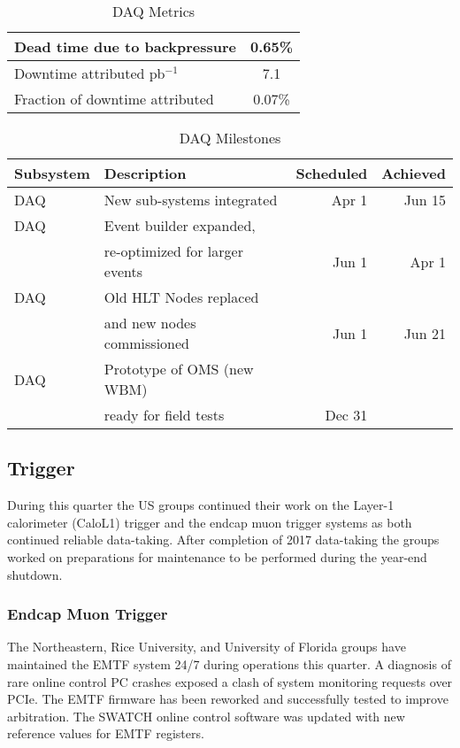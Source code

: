 \documentclass[12pt]{article}
\begin{document}
\begin{table}[htp]
\caption{DAQ Metrics}
\begin{center}
\begin{tabular}{|l|c|}
\hline
Dead time due to backpressure &0.65\%  \\
\hline
Downtime attributed pb$^{-1}$ &7.1 \\
Fraction of downtime attributed&0.07\% \\
\hline
\end{tabular}
\end{center}
\label{DAQMetrics}
\end{table}%
\begin{table}[h]
\caption{DAQ Milestones}
\begin{center}
\begin{tabular}{|l|l|r|r|}
\hline
Subsystem&Description&Scheduled&Achieved\\
\hline
DAQ& New sub-systems integrated  & Apr 1&Jun 15 \\
\hline
DAQ& Event builder expanded, & &\\
   & re-optimized for larger events & Jun 1 &Apr 1 \\
\hline
DAQ& Old HLT Nodes replaced & &\\
   & and new nodes commissioned & Jun 1 &Jun 21 \\
\hline
DAQ& Prototype of OMS (new WBM) & &\\ 
   & ready for field tests &Dec 31& \\
\hline
\end{tabular}
\end{center}
\label{DAQMilestones}
\end{table}%

\subsection{Trigger}

During this quarter the US groups continued their work on the Layer-1 calorimeter (CaloL1) trigger and the endcap muon trigger systems as both continued reliable data-taking. After completion of 2017 data-taking the groups worked on preparations for maintenance to be performed during the year-end shutdown.

\subsubsection{Endcap Muon Trigger}

The Northeastern, Rice University, and University of Florida groups
have maintained the EMTF system 24/7 during operations this quarter.  
A diagnosis of rare online control PC crashes exposed a clash of system
monitoring requests over PCIe. The EMTF firmware has been reworked and
successfully tested to improve arbitration. The SWATCH online
control software was updated with new reference values for EMTF registers. 
\end{document}
